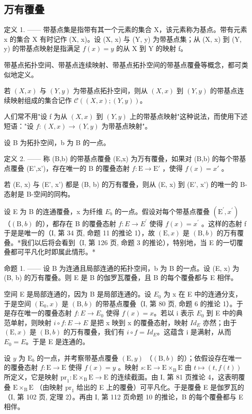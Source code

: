 \subsection{万有覆叠}

定义 1. —— 带基点集是指带有其一个元素的集合 X，该元素称为基点。带有元素 x 的集合 X 有时记作 (X, x)。设 (X, x) 与 (Y, y) 为带基点集；从 (X, x) 到 (Y, y) 的带基点映射是指满足 \(f(x) = y\) 的从 X 到 Y 的映射 f。

带基点拓扑空间、带基点连续映射、带基点拓扑空间的带基点覆叠等概念，都可类似地定义。

若 \((X,x)\) 与 \((Y,y)\) 为带基点拓扑空间，则从 \((X,x)\) 到 \((Y,y)\) 的带基点连续映射组成的集合记作 \(\mathcal{C}((X,x);(Y,y))\)。

人们常不用"设 f 为从 \((X, x)\) 到 \((Y, y)\) 上的带基点映射"这种说法，而使用下述短语："设 \(f: (X, x) \to (Y, y)\) 为带基点映射"。

设 B 为拓扑空间，b 为 B 的一点。

定义 2. —— 称 (B,b) 的带基点覆叠 (E,x) 为万有覆叠，如果对 (B,b) 的每个带基点覆叠 (E',x')，存在唯一的 B 的覆叠态射 \(f: \mathrm{E} \to \mathrm{E}'\) ，使得 \(f(x) = x'\) 。

若 (E, x) 与 (E', x') 都是 (B, b) 的万有覆叠，则从 (E, x) 到 (E', x') 的唯一的 B-态射是 B-空间的同构。

设 E 为 B 的连通覆叠，x 为纤维 \(E_{b}\) 的一点。假设对每个带基点覆叠 \((\mathrm{E}^{\prime}, x^{\prime})\) （\((\mathrm{B}, b)\) 的），都存在 B 的覆叠态射 \(f: E \to E^{\prime}\) 使得 \(f(x) = x^{\prime}\) 。这样的态射 f 于是是唯一的（I, 第 34 页, 命题 11 的推论 1），故 \((\mathrm{E}, x)\) 是 \((\mathrm{B}, b)\) 的万有覆叠。*我们以后将会看到（I, 第 126 页, 命题 3 的推论），特别地，当 E 的一切覆叠都可平凡化时即属此情形。*

命题 1. —— 设 B 为连通且局部连通的拓扑空间，b 为 B 的一点。设 (E, x) 为 (B, b) 的万有覆叠。则 E 是 B 的伽罗瓦覆叠，且 B 的每个覆叠都与 E 相伴。

空间 E 是局部连通的，因为 B 是局部连通的。设 \(E_{0}\) 为 x 在 E 中的连通分支，于是空间 \((\mathrm{E}_{0}, x)\) 是 \((\mathrm{B}, b)\) 的带基点覆叠（I, 第 80 页, 命题 6 的推论 1）。于是存在唯一的覆叠态射 \(f: E \to E_{0}\) 使得 \(f(x) = x\)。若以 i 表示 \(E_{0}\) 到 E 中的典范单射，则映射 \(i \circ f: E \to E\) 是把 x 映到 x 的覆叠态射，映射 \(Id_{E}\) 亦然；由于 \((\mathrm{E}, x)\) 是 \((\mathrm{B}, b)\) 的万有覆叠，我们有 \(i \circ f = Id_{E}\)。这蕴含 i 是满射，从而 \(E_{0} = E\)。于是 E 是连通的。

设 \(y\) 为 \(\mathrm{E}_b\) 的一点，并考察带基点覆叠 \((\mathrm{E},y)\) （\((\mathrm{B},b)\) 的）；依假设存在唯一的覆叠态射 \(f\colon \mathrm{E}\to \mathrm{E}\) 使得 \(f(x) = y\) 。映射 \(s\colon \mathrm{E}\to \mathrm{E}\times_{\mathrm{B}}\mathrm{E}\) 由 \(t\mapsto (t,f(t))\) 所定义，它是映射 \(\mathrm{pr}_1\colon \mathrm{E}\times_{\mathrm{B}}\mathrm{E}\to \mathrm{E}\) 的连续截面。由 I, 第 81 页推论 4，这表明覆叠 \(\mathrm{E}\times_{\mathrm{B}}\mathrm{E}\) （由映射 \(\mathrm{pr}_1\) 给出的 E 上的覆叠）可平凡化。于是覆叠 E 是伽罗瓦的（I, 第 102 页, 定理 2）。再由 I, 第 112 页命题 10 的推论，B 的每个覆叠都与 E 相伴。


